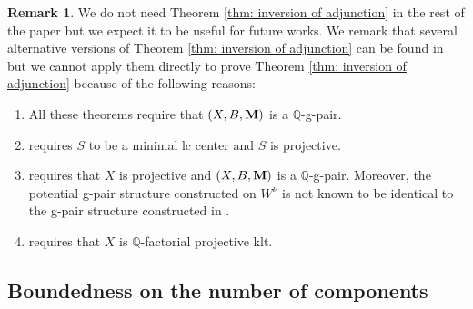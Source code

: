 \documentclass[11pt]{amsart}
\numberwithin{equation}{section}
\newcommand{\Mm}{{\bf{M}}}
\newcommand{\Qq}{\mathbb{Q}}
\theoremstyle{definition}
\theoremstyle{definition}
\newtheorem{rem}[thm]{Remark}
\theoremstyle{definition}
\begin{document}
\begin{rem}
    We do not need Theorem \ref{thm: inversion of adjunction} in the rest of the paper but we expect it to be useful for future works. We remark that several alternative versions of Theorem \ref{thm: inversion of adjunction} can be found in \cite[Theorems 1.5, 1.6, 6.7]{Fil20} but we cannot apply them directly to prove Theorem \ref{thm: inversion of adjunction} because of the following reasons:
\begin{enumerate}
\item All these theorems require that $(X,B,\Mm)$ is a $\Qq$-g-pair.
\item \cite[Theorems 1.5]{Fil20} requires $S$ to be a minimal lc center and $S$ is projective.
\item \cite[Theorems 1.6]{Fil20} requires that $X$ is projective and $(X,B,\Mm)$ is a $\Qq$-g-pair. Moreover, the potential g-pair structure constructed on $W^\nu$ \cite[Theorems 1.6]{Fil20} is not known to be identical to the g-pair structure constructed in \cite[Theorem 4.5]{HL21b}.
\item \cite[Theorem 6.7]{Fil20} requires that $X$ is $\Qq$-factorial projective klt.
\end{enumerate}  
\end{rem}




\subsection{Boundedness on the number of components}
\end{document}
